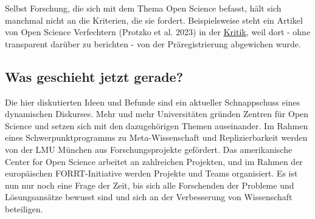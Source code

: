 \documentclass[
  letterpaper,
  DIV=11,
  numbers=noendperiod]{scrreprt}
\begin{document}
\begin{tcolorbox}[enhanced jigsaw, title=\textcolor{quarto-callout-warning-color}{\faExclamationTriangle}\hspace{0.5em}{Open Washing}, colbacktitle=quarto-callout-warning-color!10!white, rightrule=.15mm, titlerule=0mm, left=2mm, bottomrule=.15mm, arc=.35mm, leftrule=.75mm, toprule=.15mm, opacityback=0, breakable, bottomtitle=1mm, colframe=quarto-callout-warning-color-frame, toptitle=1mm, opacitybacktitle=0.6, coltitle=black, colback=white]

Selbst Forschung, die sich mit dem Thema Open Science befasst, hält sich
manchmal nicht an die Kriterien, die sie fordert. Beispielsweise steht
ein Artikel von Open Science Verfechtern (Protzko et al. 2023) in der
\href{https://statmodeling.stat.columbia.edu/2023/11/21/of-course-its-preregistered-just-give-me-a-sec/}{Kritik},
weil dort - ohne transparent darüber zu berichten - von der
Präregistrierung abgewichen wurde.

\end{tcolorbox}

\subsection*{Was geschieht jetzt
gerade?}\label{was-geschieht-jetzt-gerade}

Die hier diskutierten Ideen und Befunde sind ein aktueller Schnappschuss
eines dynamischen Diskurses. Mehr und mehr Universitäten gründen Zentren
für Open Science und setzen sich mit den dazugehörigen Themen
auseinander. Im Rahmen eines Schwerpunktprogramms zu Meta-Wissenschaft
und Replizierbarkeit werden von der LMU München aus Forschungsprojekte
gefördert. Das amerikanische Center for Open Science arbeitet an
zahlreichen Projekten, und im Rahmen der europäischen FORRT-Initiative
werden Projekte und Teams organisiert. Es ist nun nur noch eine Frage
der Zeit, bis sich alle Forschenden der Probleme und Lösungsansätze
bewusst sind und sich an der Verbesserung von Wissenschaft beteiligen.
\end{document}
